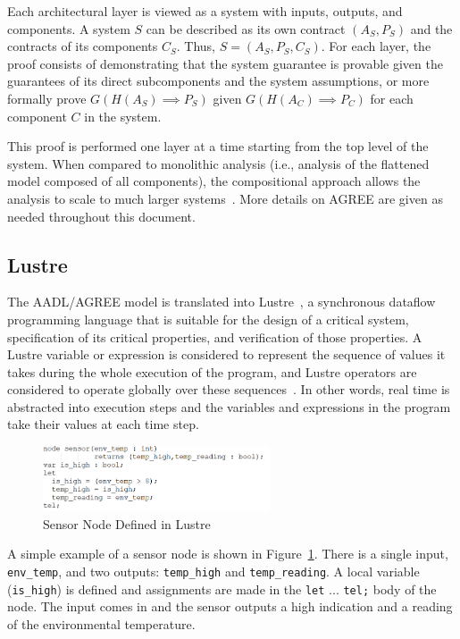 Each architectural layer is viewed as a system with inputs, outputs, and components. A system $S$ can be described as its own contract $(A_S, P_S)$ and the contracts of its components $C_S$. Thus, $S = (A_S, P_S, C_S)$. For each layer, the proof consists of demonstrating that the system guarantee is provable given the guarantees of its direct subcomponents and the system assumptions, or more formally prove $G(H(A_S) \implies P_S)$ given $G(H(A_C) \implies P_C)$ for each component $C$ in the system.  

This proof is performed one layer at a time starting from the top level of the system. When compared to monolithic analysis (i.e., analysis of the flattened model composed of all components), the compositional approach allows the analysis to scale to much larger systems~\cite{NFM2012:CoGaMiWhLaLu}. More details on AGREE are given as needed throughout this document.

\subsection{Lustre}
\label{sec:lustre}
The AADL/AGREE model is translated into Lustre~\cite{Halbwachs91:IEEE}, a synchronous dataflow programming language that is suitable for the design of a critical system, specification of its critical properties, and verification of those properties. A Lustre variable or expression is considered to represent the sequence of values it takes during the whole execution of the program, and Lustre operators are considered to operate globally over these sequences~\cite{Halbwachs91:IEEE}. In other words, real time is abstracted into execution steps and the variables and expressions in the program take their values at each time step. 

\begin{figure}[h]
	\begin{center}
		\includegraphics[width=0.6\textwidth]{images/lustreExample.PNG}
	\end{center}
	\caption{Sensor Node Defined in Lustre}
	\label{fig:lustreExample}
\end{figure}

A simple example of a sensor node is shown in Figure~\ref{fig:lustreExample}. There is a single input, \texttt{env\_temp}, and two outputs: \texttt{temp\_high} and \texttt{temp\_reading}. A local variable (\texttt{is\_high}) is defined and assignments are made in the \texttt{let} ... \texttt{tel;} body of the node. The input comes in and the sensor outputs a high indication and a reading of the environmental temperature. 

